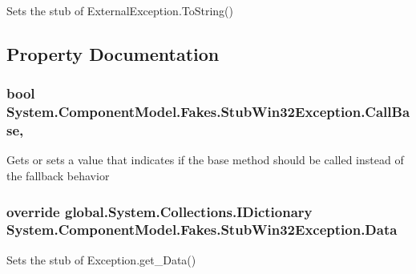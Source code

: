 Sets the stub of External\-Exception.\-To\-String()



\subsection{Property Documentation}
\hypertarget{class_system_1_1_component_model_1_1_fakes_1_1_stub_win32_exception_a443cb7c84a93f12a9dae95bda6eb5e4e}{
\subsubsection[{Call\-Base}]{\setlength{\rightskip}{0pt plus 5cm}bool System.\-Component\-Model.\-Fakes.\-Stub\-Win32\-Exception.\-Call\-Base\hspace{0.3cm}{\ttfamily [get]}, {\ttfamily [set]}}}\label{class_system_1_1_component_model_1_1_fakes_1_1_stub_win32_exception_a443cb7c84a93f12a9dae95bda6eb5e4e}


Gets or sets a value that indicates if the base method should be called instead of the fallback behavior

\hypertarget{class_system_1_1_component_model_1_1_fakes_1_1_stub_win32_exception_a145b6b9714d3c46ba16bafdab34d8b83}{
\subsubsection[{Data}]{\setlength{\rightskip}{0pt plus 5cm}override global.\-System.\-Collections.\-I\-Dictionary System.\-Component\-Model.\-Fakes.\-Stub\-Win32\-Exception.\-Data\hspace{0.3cm}{\ttfamily [get]}}}\label{class_system_1_1_component_model_1_1_fakes_1_1_stub_win32_exception_a145b6b9714d3c46ba16bafdab34d8b83}


Sets the stub of Exception.\-get\-\_\-\-Data()

